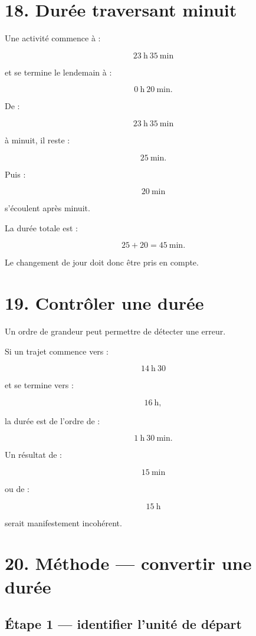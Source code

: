 \section{18. Durée traversant minuit}

Une activité commence à :

\[
23\ \text{h}\ 35\ \text{min}
\]

et se termine le lendemain à :

\[
0\ \text{h}\ 20\ \text{min}.
\]

De :

\[
23\ \text{h}\ 35\ \text{min}
\]

à minuit, il reste :

\[
25\ \text{min}.
\]

Puis :

\[
20\ \text{min}
\]

s’écoulent après minuit.

La durée totale est :

\[
25+20=45\ \text{min}.
\]

Le changement de jour doit donc être pris en compte.

\section{19. Contrôler une durée}

Un ordre de grandeur peut permettre de détecter une erreur.

Si un trajet commence vers :

\[
14\ \text{h}\ 30
\]

et se termine vers :

\[
16\ \text{h},
\]

la durée est de l’ordre de :

\[
1\ \text{h}\ 30\ \text{min}.
\]

Un résultat de :

\[
15\ \text{min}
\]

ou de :

\[
15\ \text{h}
\]

serait manifestement incohérent.

\section{20. Méthode — convertir une durée}

\subsection{Étape 1 — identifier l’unité de départ}

